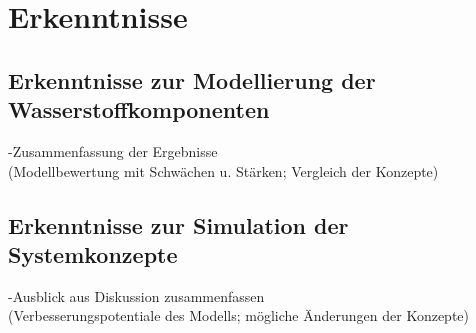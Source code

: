 \chapter{Erkenntnisse}
\label{cha:Erkenntnisse}
\section{Erkenntnisse zur Modellierung der Wasserstoffkomponenten}
-Zusammenfassung der Ergebnisse\\
(Modellbewertung mit Schwächen u. Stärken; Vergleich der Konzepte)\\
\section{Erkenntnisse zur Simulation der Systemkonzepte}
-Ausblick aus Diskussion zusammenfassen\\
(Verbesserungspotentiale des Modells; mögliche Änderungen der Konzepte)\\
